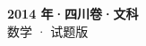 \documentclass[zihao=-4, a4paper]{ctexart}
\begin{document}
\begin{center}
  {\Large\bfseries 2014 年·四川卷·文科}\\[4pt]
  {\large 数学 · 试题版}
\end{center}
\medskip
{}

\end{document}
